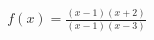\documentclass[preview]{standalone}
\begin{document}
\begin{align*}
f(x) = \frac{(x-1)(x + 2)}{(x-1)(x - 3)}
\end{align*}
\end{document}
